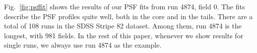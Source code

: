 Fig.~\ref{fig:psffit} shows the results of our PSF fits from run 4874,
field 0. The fits describe the PSF profiles quite well, both in the core and in the tails.
There are a total of 108 runs in the SDSS Stripe 82 dataset. Among them, run 4874 
is the longest, with 981 fields. In the rest of this paper, whenever we show 
results for single runs, we always use run 4874 as the example.
